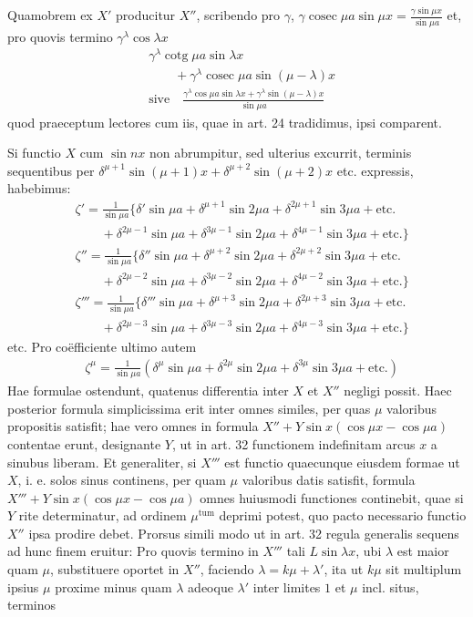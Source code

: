 Quamobrem ex $X'$ producitur $X''$, scribendo pro $\gamma$, $\gamma\operatorname{cosec}\mu a\sin\mu x=\frac{\gamma\sin\mu x}{\sin\mu a}$ et, pro quovis termino $\gamma^{\lambda}\cos\lambda x$
\[
\begin{aligned}
&\gamma^{\lambda}\operatorname{cotg}\mu a\sin\lambda x\\[5pt]
&\qquad{}+\gamma^{\lambda}\operatorname{cosec}\mu a\sin(\mu-\lambda)x
\\[5pt]
&\text{sive}\quad
\frac{\gamma^{\lambda}\cos\mu a\sin\lambda x+\gamma^{\lambda}\sin(\mu-\lambda)x}{\sin\mu a}
\end{aligned}
\]
quod praeceptum lectores cum iis, quae in art. 24 tradidimus, ipsi comparent.

Si functio $X$ cum $\sin nx$ non abrumpitur, sed ulterius excurrit, terminis sequentibus per $\delta^{\mu+1}\sin(\mu+1)x+\delta^{\mu+2}\sin(\mu+2)x$ etc. expressis, habebimus:
\[
\begin{aligned}
&\zeta'={}\frac{1}{\sin\mu a}\{\delta'\sin\mu a+\delta^{\mu+1}\sin 2\mu a+\delta^{2\mu+1}\sin 3\mu a+\text{etc.}\\[5pt]
&\qquad+\delta^{2\mu-1}\sin\mu a+\delta^{3\mu-1}\sin 2\mu a+\delta^{4\mu-1}\sin 3\mu a+\text{etc.}\}\\[5pt]
&\zeta''={}\frac{1}{\sin\mu a}\{\delta''\sin\mu a+\delta^{\mu+2}\sin 2\mu a+\delta^{2\mu+2}\sin 3\mu a+\text{etc.}\\[5pt]
&\qquad+\delta^{2\mu-2}\sin\mu a+\delta^{3\mu-2}\sin 2\mu a+\delta^{4\mu-2}\sin 3\mu a+\text{etc.}\}\\[5pt]
&\zeta'''={}\frac{1}{\sin\mu a}\{\delta'''\sin\mu a+\delta^{\mu+3}\sin 2\mu a+\delta^{2\mu+3}\sin 3\mu a+\text{etc.}\\[5pt]
&\qquad+\delta^{2\mu-3}\sin\mu a+\delta^{3\mu-3}\sin 2\mu a+\delta^{4\mu-3}\sin 3\mu a+\text{etc.}\}
\end{aligned}
\]
etc. Pro coëfficiente ultimo autem
\[
\begin{aligned}
&\zeta^{\mu}=\frac{1}{\sin\mu a}(\delta^{\mu}\sin\mu a+\delta^{2\mu}\sin 2\mu a+\delta^{3\mu}\sin 3\mu a+\text{etc.})
\end{aligned}
\]
Hae formulae ostendunt, quatenus differentia inter $X$ et $X''$ negligi possit. Haec posterior formula simplicissima erit inter omnes similes, per quas $\mu$ valoribus propositis satisfit; hae vero omnes in formula $X''+Y\sin x(\cos\mu x-\cos\mu a)$ contentae erunt, designante $Y$, ut in art. 32 functionem indefinitam arcus $x$ a sinubus liberam. Et generaliter, si $X'''$ est functio quaecunque eiusdem formae ut $X$, i. e. solos sinus continens, per quam $\mu$ valoribus datis satisfit, formula $X'''+Y\sin x(\cos\mu x-\cos\mu a)$ omnes huiusmodi functiones continebit, quae si $Y$ rite determinatur, ad ordinem $\mu^{\mathrm{tum}}$ deprimi potest, quo pacto necessario functio $X''$ ipsa prodire debet. Prorsus simili modo ut in art. 32 regula generalis sequens ad hunc finem eruitur: Pro quovis termino in $X'''$ tali $L\sin\lambda x$, ubi $\lambda$ est maior quam $\mu$, substituere oportet in $X''$, faciendo $\lambda=k\mu+\lambda'$, ita ut $k\mu$ sit multiplum ipsius $\mu$ proxime minus quam $\lambda$ adeoque $\lambda'$ inter limites $1$ et $\mu$ incl. situs, terminos
